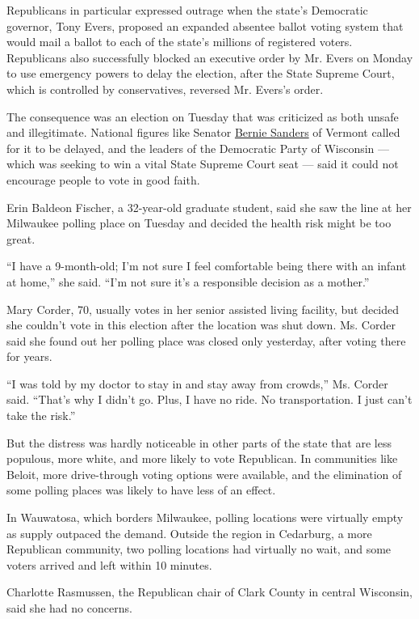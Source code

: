 Republicans in particular expressed outrage when the state's Democratic
governor, Tony Evers, proposed an expanded absentee ballot voting system
that would mail a ballot to each of the state's millions of registered
voters. Republicans also successfully blocked an executive order by Mr.
Evers on Monday to use emergency powers to delay the election, after the
State Supreme Court, which is controlled by conservatives, reversed Mr.
Evers's order.

The consequence was an election on Tuesday that was criticized as both
unsafe and illegitimate. National figures like Senator
\href{https://www.nytimes3xbfgragh.onion/interactive/2020/us/elections/bernie-sanders.html}{Bernie
Sanders} of Vermont called for it to be delayed, and the leaders of the
Democratic Party of Wisconsin --- which was seeking to win a vital State
Supreme Court seat --- said it could not encourage people to vote in
good faith.

Erin Baldeon Fischer, a 32-year-old graduate student, said she saw the
line at her Milwaukee polling place on Tuesday and decided the health
risk might be too great.

``I have a 9-month-old; I'm not sure I feel comfortable being there with
an infant at home,'' she said. ``I'm not sure it's a responsible
decision as a mother.''

Mary Corder, 70, usually votes in her senior assisted living facility,
but decided she couldn't vote in this election after the location was
shut down. Ms. Corder said she found out her polling place was closed
only yesterday, after voting there for years.

``I was told by my doctor to stay in and stay away from crowds,'' Ms.
Corder said. ``That's why I didn't go. Plus, I have no ride. No
transportation. I just can't take the risk.''

But the distress was hardly noticeable in other parts of the state that
are less populous, more white, and more likely to vote Republican. In
communities like Beloit, more drive-through voting options were
available, and the elimination of some polling places was likely to have
less of an effect.

In Wauwatosa, which borders Milwaukee, polling locations were virtually
empty as supply outpaced the demand. Outside the region in Cedarburg, a
more Republican community, two polling locations had virtually no wait,
and some voters arrived and left within 10 minutes.

Charlotte Rasmussen, the Republican chair of Clark County in central
Wisconsin, said she had no concerns.

